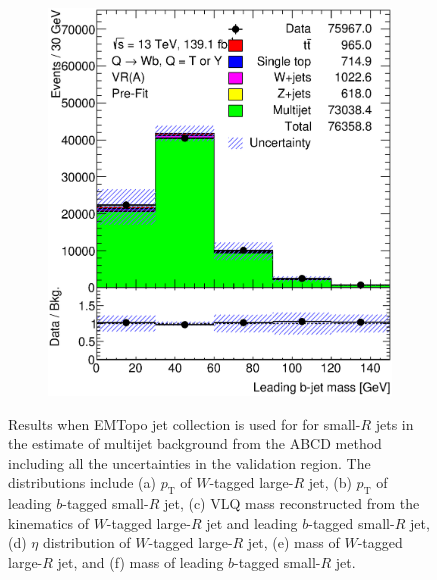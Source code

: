 \begin{figure}[hbt!]
\begin{subfigure}{.35\textwidth}
		\caption{}
		\label{fig:results:jetcollections:ljet_m}
	\end{subfigure}\hspace{0.6cm}
	\begin{subfigure}{.35\textwidth}
		\centering
		\includegraphics[width=\linewidth,height=\textheight,keepaspectratio]{VR_B_jet_m.eps}
		\caption{}
		\label{fig:results:jetcollections:jet_m}
	\end{subfigure}
	\caption{Results when EMTopo jet collection is used for for small-$R$ jets in the estimate of multijet background from the ABCD method including all the uncertainties in the validation region. The distributions include (a) $p_{\text{T}}$ of $W$-tagged large-$R$ jet, (b) $p_{\text{T}}$ of leading $b$-tagged small-$R$ jet, (c) VLQ mass reconstructed from the kinematics of $W$-tagged large-$R$ jet and leading $b$-tagged small-$R$ jet, (d) $\eta$ distribution of $W$-tagged large-$R$ jet, (e) mass of $W$-tagged large-$R$ jet, and (f) mass of leading $b$-tagged small-$R$ jet.}
	\label{fig:results:jetcollections}
\end{figure}




